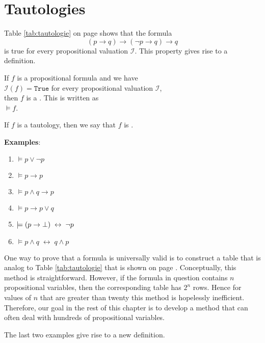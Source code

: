 \section{Tautologies}
Table \ref{tab:tautologie} on page \pageref{tab:tautologie} shows that the formula
$$  (p \rightarrow q) \rightarrow (\neg p \rightarrow q) \rightarrow q $$
is true for every propositional valuation $\mathcal{I}$.  This property gives rise to a definition.

\begin{Definition}[Tautology]
  If $f$ is a propositional formula and we have  \\[0.2cm]
  \hspace*{1.3cm} $\mathcal{I}(f) = \texttt{True}$ \quad for every propositional valuation $\mathcal{I}$, \\[0.2cm]
  then $f$ is a  .  This is written as \\[0.2cm]
  \hspace*{1.3cm} $\models f$.
  \eox
\end{Definition}

\noindent
If $f$ is a tautology, then we say that $f$ is  .

\noindent
\textbf{Examples}:
\begin{enumerate}
\item $\models p \vee \neg p$
\item $\models p \rightarrow p$
\item $\models p \wedge q \rightarrow p$
\item $\models p \rightarrow p \vee q$
\item $\models (p \rightarrow \bot) \;\leftrightarrow\; \neg p$
\item $\models p \wedge q \;\leftrightarrow\; q \wedge p$
\end{enumerate}
One way to prove that a formula is universally valid is to construct a table that is analog 
to Table \ref{tab:tautologie} that is shown on page \pageref{tab:tautologie}.
Conceptually, this method is straightforward.  However, if the formula in question contains $n$
propositional variables, then the corresponding table has $2^n$ rows.  Hence for values of $n$ that are greater
than twenty this method is hopelessly inefficient.  Therefore, our goal in the rest of this chapter is to develop
a method that can often deal with hundreds of propositional variables.

The last two examples give rise to a new definition.

